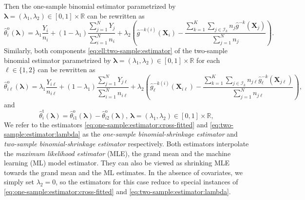 \documentclass[12pt,letterpaper]{article}
\begin{document}
Then the one-sample binomial estimator parametrized by $\boldsymbol{\lambda}=(\lambda_1,\lambda_2)\in[0,1]\times\mathbb{R}$ can be rewritten as 
\begin{equation}\label{eq:one-sample:estimator:cross-fitted}
\hat{\theta}_i^{\mathrm{o}}(\boldsymbol{\lambda})=\lambda_1\frac{Y_i}{n_i} + (1-\lambda_1)\frac{\sum_{j=1}^{N}Y_j}{\sum_{i=1}^{N}n_i}+\lambda_2\left(\hat{g}^{-k(i)}(\mathbf{X}_i)-\frac{\sum_{k=1}^K\sum_{j\in\mathcal{I}_k}n_j\hat{g}^{-k}(\mathbf{X}_{j})}{\sum_{j=1}^Nn_j}\right).
\end{equation}
Similarly, both components \eqref{eq:ell:two-sample:estimator} of the two-sample binomial estimator parametrized by $\boldsymbol{\lambda}=(\lambda_1,\lambda_2)\in[0,1]\times\mathbb{R}$ for each $\ell\in\{1,2\}$ can be rewritten as 
\begin{equation}\label{eq:two-sample:estimator:cross-fitted:ell}
\hat{\theta}_{i\ell}^{\mathrm{o}}(\boldsymbol{\lambda})=\lambda_1\frac{Y_{i\ell}}{n_{i\ell}} + (1-\lambda_1)\frac{\sum_{j=1}^{N}Y_{j\ell}}{\sum_{i=1}^{N}n_{i\ell}}+\lambda_2\left(\hat{g}_{\ell}^{-k(i)}(\mathbf{X}_{i\ell})-\frac{\sum_{k=1}^K\sum_{j\in\mathcal{I}_k}n_{j\ell}\hat{g}_{\ell}^{-k}(\mathbf{X}_{j\ell})}{\sum_{j=1}^Nn_{j\ell}}\right),
\end{equation}
and 
\begin{equation}
  \label{eq:two-sample:estimator:lambda}
  \hat{\theta}_i^{\mathrm{t}}(\boldsymbol\lambda) = \hat{\theta}_{i1}^{\mathrm{o}}(\boldsymbol{\lambda}) - \hat{\theta}_{i2}^{\mathrm{o}}(\boldsymbol{\lambda}),\ \boldsymbol{\lambda}=(\lambda_1,\lambda_2)\in[0,1]\times\mathbb{R},
\end{equation}
We refer to the estimators \eqref{eq:one-sample:estimator:cross-fitted} and \eqref{eq:two-sample:estimator:lambda} as the \textit{one-sample binomial-shrinkage estimator} and \textit{two-sample binomial-shrinkage estimator} respectively. Both estimators interpolate the \textit{maximum likelihood estimator} (MLE), the grand mean and the machine learning (ML) model estimator. They can also be viewed as shrinking MLE towards the grand mean and the ML estimates. In the absence of covariates, we simply set $\lambda_2 = 0$, so the estimators for this case reduce to special instances of \eqref{eq:one-sample:estimator:cross-fitted} and \eqref{eq:two-sample:estimator:lambda}.
\end{document}
